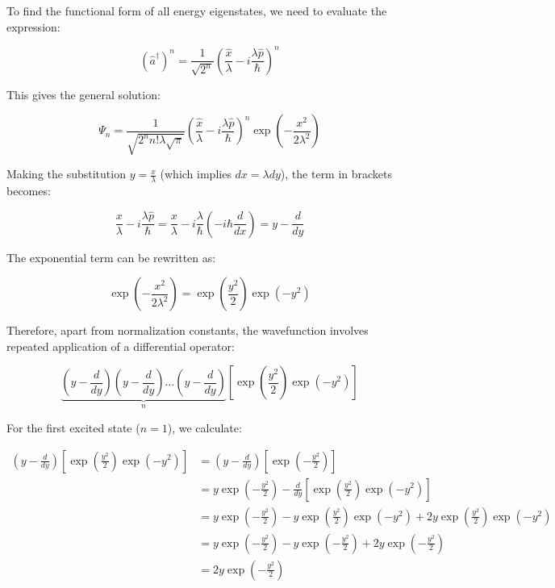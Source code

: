 \documentclass[10pt]{article}
\begin{document}
To find the functional form of all energy eigenstates, we need to evaluate the expression:

\begin{equation*}
(\hat{a}^\dagger)^n = \frac{1}{\sqrt{2^n}}\left(\frac{\hat{x}}{\lambda} - i\frac{\lambda\hat{p}}{\hbar}\right)^n \tag{5.44}
\end{equation*}

This gives the general solution:

\begin{equation*}
\Psi_n = \frac{1}{\sqrt{2^n n!\lambda\sqrt{\pi}}}\left(\frac{\hat{x}}{\lambda} - i\frac{\lambda\hat{p}}{\hbar}\right)^n\exp\left(-\frac{x^2}{2\lambda^2}\right) \tag{5.45}
\end{equation*}

Making the substitution $y = \frac{x}{\lambda}$ (which implies $dx = \lambda dy$), the term in brackets becomes:

\begin{equation*}
\frac{x}{\lambda} - i\frac{\lambda\hat{p}}{\hbar} = \frac{x}{\lambda} - i\frac{\lambda}{\hbar}\left(-i\hbar\frac{d}{dx}\right) = y - \frac{d}{dy} \tag{5.46}
\end{equation*}

The exponential term can be rewritten as:

\begin{equation*}
\exp\left(-\frac{x^2}{2\lambda^2}\right) = \exp\left(\frac{y^2}{2}\right)\exp(-y^2) \tag{5.47}
\end{equation*}

Therefore, apart from normalization constants, the wavefunction involves repeated application of a differential operator:

\begin{equation*}
\underbrace{\left(y - \frac{d}{dy}\right)\left(y - \frac{d}{dy}\right)\ldots\left(y - \frac{d}{dy}\right)}_{n}\left[\exp\left(\frac{y^2}{2}\right)\exp(-y^2)\right] \tag{5.48}
\end{equation*}

For the first excited state ($n=1$), we calculate:

\begin{align*}
\left(y-\frac{d}{dy}\right)\left[\exp\left(\frac{y^2}{2}\right)\exp(-y^2)\right] &= \left(y-\frac{d}{dy}\right)\left[\exp\left(-\frac{y^2}{2}\right)\right] \\
&= y\exp\left(-\frac{y^2}{2}\right) - \frac{d}{dy}\left[\exp\left(\frac{y^2}{2}\right)\exp(-y^2)\right] \\
&= y\exp\left(-\frac{y^2}{2}\right) - y\exp\left(\frac{y^2}{2}\right)\exp(-y^2) + 2y\exp\left(\frac{y^2}{2}\right)\exp(-y^2) \\
&= y\exp\left(-\frac{y^2}{2}\right) - y\exp\left(-\frac{y^2}{2}\right) + 2y\exp\left(-\frac{y^2}{2}\right) \\
&= 2y\exp\left(-\frac{y^2}{2}\right) \tag{5.49}
\end{align*}
\end{document}
